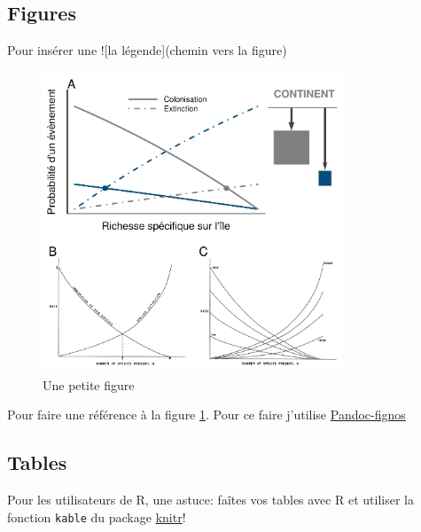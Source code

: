 \subsection*{Figures}\label{figures}

Pour insérer une !{[}la légende{]}(chemin vers la figure)

\begin{figure}
\centering
\includegraphics[width=0.80000\textwidth]{fig/fig1.pdf}
\caption{Une petite figure\label{fig:intr1}}
\end{figure}

Pour faire une référence à la figure \ref{fig:intr1}. Pour ce faire
j'utilise \href{https://github.com/tomduck/pandoc-fignos}{Pandoc-fignos}

\subsection*{Tables}\label{tables}

Pour les utilisateurs de R, une astuce: faîtes vos tables avec R et
utiliser la fonction \texttt{kable} du package
\href{http://yihui.name/knitr/}{knitr}!

